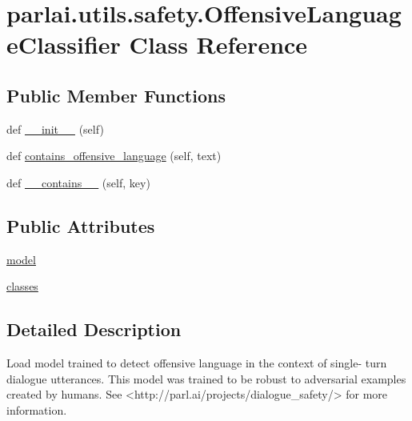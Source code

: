 \hypertarget{classparlai_1_1utils_1_1safety_1_1OffensiveLanguageClassifier}{}\section{parlai.\+utils.\+safety.\+Offensive\+Language\+Classifier Class Reference}
\label{classparlai_1_1utils_1_1safety_1_1OffensiveLanguageClassifier}
\subsection*{Public Member Functions}
\begin{DoxyCompactItemize}
\item 
def \hyperlink{classparlai_1_1utils_1_1safety_1_1OffensiveLanguageClassifier_a93630f9592ceded8584a09a0b9553ab5}{\+\_\+\+\_\+init\+\_\+\+\_\+} (self)
\item 
def \hyperlink{classparlai_1_1utils_1_1safety_1_1OffensiveLanguageClassifier_a7f4e833bea93ab9f920f2dd2a4b6e586}{contains\+\_\+offensive\+\_\+language} (self, text)
\item 
def \hyperlink{classparlai_1_1utils_1_1safety_1_1OffensiveLanguageClassifier_a86de8f64f68732b91d4cdfdf65dd841c}{\+\_\+\+\_\+contains\+\_\+\+\_\+} (self, key)
\end{DoxyCompactItemize}
\subsection*{Public Attributes}
\begin{DoxyCompactItemize}
\item 
\hyperlink{classparlai_1_1utils_1_1safety_1_1OffensiveLanguageClassifier_a917240edc6718f3b7f3560214780ac9d}{model}
\item 
\hyperlink{classparlai_1_1utils_1_1safety_1_1OffensiveLanguageClassifier_a4230d2f45693c00e565fa90d7bae2d2a}{classes}
\end{DoxyCompactItemize}


\subsection{Detailed Description}
\begin{DoxyVerb}Load model trained to detect offensive language in the context of single-
turn dialogue utterances. This model was trained to be robust to adversarial
examples created by humans. See <http://parl.ai/projects/dialogue_safety/>
for more information.
\end{DoxyVerb}
 

